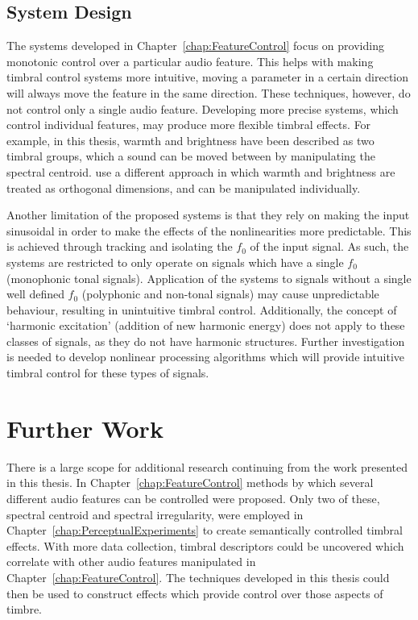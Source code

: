 	\subsection{System Design}
	\label{sec:Conclusion-Critique-SystemDesign}
		The systems developed in Chapter~\ref{chap:FeatureControl} focus on providing monotonic control over a
		particular audio feature. This helps with making timbral control systems more intuitive, moving a parameter
		in a certain direction will always move the feature in the same direction. These techniques, however, do not
		control only a single audio feature. Developing more precise systems, which control individual features, may
		produce more flexible timbral effects. For example, in this thesis, warmth and brightness have been
		described as two timbral groups, which a sound can be moved between by manipulating the spectral centroid.
		\cite{zacharakis2011an} use a different approach in which warmth and brightness are treated as orthogonal
		dimensions, and can be manipulated individually.

		Another limitation of the proposed systems is that they rely on making the input sinusoidal in order to make
		the effects of the nonlinearities more predictable. This is achieved through tracking and isolating the
		$f_{0}$ of the input signal. As such, the systems are restricted to only operate on signals which have a
		single $f_{0}$ (monophonic tonal signals). Application of the systems to signals without a single well
		defined $f_{0}$ (polyphonic and non-tonal signals) may cause unpredictable behaviour, resulting in
		unintuitive timbral control. Additionally, the concept of `harmonic excitation' (addition of new harmonic
		energy) does not apply to these classes of signals, as they do not have harmonic structures. Further
		investigation is needed to develop nonlinear processing algorithms which will provide intuitive timbral
		control for these types of signals.

\section{Further Work}
\label{sec:Conclusion-FurtherWork}
	There is a large scope for additional research continuing from the work presented in this thesis. In
	Chapter~\ref{chap:FeatureControl} methods by which several different audio features can be controlled were proposed.
	Only two of these, spectral centroid and spectral irregularity, were employed in
	Chapter~\ref{chap:PerceptualExperiments} to create semantically controlled timbral effects. With more data
	collection, timbral descriptors could be uncovered which correlate with other audio features manipulated in
	Chapter~\ref{chap:FeatureControl}. The techniques developed in this thesis could then be used to construct effects
	which provide control over those aspects of timbre.


